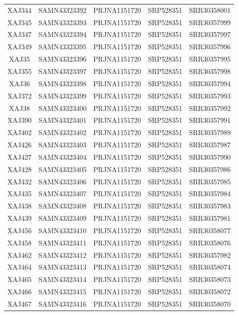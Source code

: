 \documentclass[
]{book}
\begin{document}
\begin{longtable}[]{@{}ccccc@{}}
XAJ344 & SAMN43323392 & PRJNA1151720 & SRP528351 & SRR30358001 \\
XAJ345 & SAMN43323393 & PRJNA1151720 & SRP528351 & SRR30357999 \\
XAJ347 & SAMN43323394 & PRJNA1151720 & SRP528351 & SRR30357997 \\
XAJ349 & SAMN43323395 & PRJNA1151720 & SRP528351 & SRR30357996 \\
XAJ35 & SAMN43323396 & PRJNA1151720 & SRP528351 & SRR30357995 \\
XAJ355 & SAMN43323397 & PRJNA1151720 & SRP528351 & SRR30357998 \\
XAJ36 & SAMN43323398 & PRJNA1151720 & SRP528351 & SRR30357994 \\
XAJ372 & SAMN43323399 & PRJNA1151720 & SRP528351 & SRR30357993 \\
XAJ38 & SAMN43323400 & PRJNA1151720 & SRP528351 & SRR30357992 \\
XAJ390 & SAMN43323401 & PRJNA1151720 & SRP528351 & SRR30357991 \\
XAJ402 & SAMN43323402 & PRJNA1151720 & SRP528351 & SRR30357989 \\
XAJ426 & SAMN43323403 & PRJNA1151720 & SRP528351 & SRR30357987 \\
XAJ427 & SAMN43323404 & PRJNA1151720 & SRP528351 & SRR30357990 \\
XAJ428 & SAMN43323405 & PRJNA1151720 & SRP528351 & SRR30357986 \\
XAJ432 & SAMN43323406 & PRJNA1151720 & SRP528351 & SRR30357985 \\
XAJ435 & SAMN43323407 & PRJNA1151720 & SRP528351 & SRR30357984 \\
XAJ438 & SAMN43323408 & PRJNA1151720 & SRP528351 & SRR30357983 \\
XAJ439 & SAMN43323409 & PRJNA1151720 & SRP528351 & SRR30357981 \\
XAJ456 & SAMN43323410 & PRJNA1151720 & SRP528351 & SRR30358077 \\
XAJ458 & SAMN43323411 & PRJNA1151720 & SRP528351 & SRR30358076 \\
XAJ462 & SAMN43323412 & PRJNA1151720 & SRP528351 & SRR30357982 \\
XAJ464 & SAMN43323413 & PRJNA1151720 & SRP528351 & SRR30358074 \\
XAJ465 & SAMN43323414 & PRJNA1151720 & SRP528351 & SRR30358073 \\
XAJ466 & SAMN43323415 & PRJNA1151720 & SRP528351 & SRR30358072 \\
XAJ467 & SAMN43323416 & PRJNA1151720 & SRP528351 & SRR30358070 \\

\end{longtable}
\end{document}
